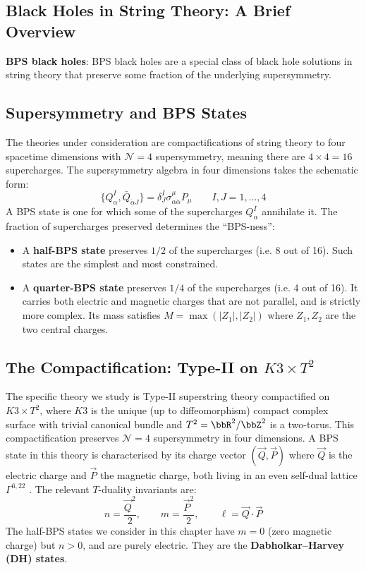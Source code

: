 \subsection{Black Holes in String Theory: A Brief Overview}
\textbf{BPS black holes}: BPS black holes are a special class of black hole solutions in string theory that preserve some fraction of the underlying supersymmetry.

\subsection{Supersymmetry and BPS States}

The theories 
under consideration are compactifications of string theory to four spacetime dimensions 
with $\mathcal{N}=4$ supersymmetry, meaning there are $4 \times 4 = 16$ 
supercharges. The supersymmetry algebra in four dimensions takes the schematic 
form:
\begin{equation}
    \{Q_\alpha^I, \bar{Q}_{\dot\alpha J}\} = \delta^I_J \sigma^\mu_{\alpha\dot\alpha} P_\mu
    \qquad I,J = 1,\ldots,4
\end{equation}
A BPS state is one for which some of the supercharges $Q_\alpha^I$ annihilate it. 
The fraction of supercharges preserved determines the ``BPS-ness'':

\begin{itemize}
    \item A \textbf{half-BPS state} preserves $1/2$ of the supercharges 
    (i.e. 8 out of 16). 
    Such states are the simplest and most constrained.
    \item A \textbf{quarter-BPS state} preserves $1/4$ of the supercharges 
    (i.e. 4 out of 16). It carries both electric and magnetic charges that are 
    not parallel, and is strictly more complex. Its mass satisfies 
    $M = \max(|Z_1|, |Z_2|)$ where $Z_1, Z_2$ are the two central charges.
\end{itemize}

\subsection{The Compactification: Type-II on $K3 \times T^2$}

The specific theory we study is Type-II superstring theory compactified on 
$K3 \times T^2$, where $K3$ is the unique (up to diffeomorphism) compact 
complex surface with trivial canonical bundle and $T^2 = \bbR^2/\bbZ^2$ is a 
two-torus. This compactification preserves $\mathcal{N}=4$ supersymmetry in 
four dimensions. 
A BPS state in this theory is characterised by its charge vector $(\vec{Q}, \vec{P})$ 
where $\vec{Q}$ is the electric charge and $\vec{P}$ the magnetic charge, both 
living in an even self-dual lattice $\Gamma^{6,22}$ \cite[Section~2]{DMZ}. The relevant $T$-duality 
invariants are:
\begin{equation}
    n = \frac{\vec{Q}^2}{2}, \qquad m = \frac{\vec{P}^2}{2}, \qquad 
    \ell = \vec{Q}\cdot\vec{P}
\end{equation}
The half-BPS states we consider in this chapter have $m = 0$ (zero magnetic 
charge) but $n > 0$, and are purely electric. They are the 
\textbf{Dabholkar--Harvey (DH) states}.

